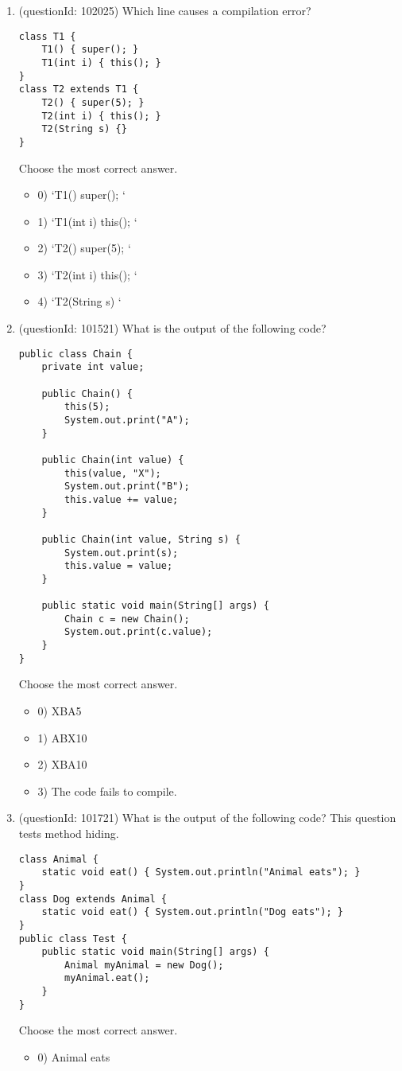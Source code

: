 \documentclass[12pt]{article}
\begin{document}
\begin{enumerate}[label=(\arabic*)]
\begin{itemize}
\end{itemize}
\item (questionId: 102025) Which line causes a compilation error?
\begin{verbatim}
class T1 {
    T1() { super(); }
    T1(int i) { this(); }
}
class T2 extends T1 {
    T2() { super(5); }
    T2(int i) { this(); }
    T2(String s) {}
}
\end{verbatim}
Choose the most correct answer. 
\begin{itemize}
\item 0) `T1() { super(); }`

\item 1) `T1(int i) { this(); }`

\item 2) `T2() { super(5); }`

\item 3) `T2(int i) { this(); }`

\item 4) `T2(String s) {}`

\end{itemize}
\item (questionId: 101521) What is the output of the following code?\n\begin{verbatim}
public class Chain {
    private int value;

    public Chain() {
        this(5);
        System.out.print("A");
    }

    public Chain(int value) {
        this(value, "X");
        System.out.print("B");
        this.value += value;
    }

    public Chain(int value, String s) {
        System.out.print(s);
        this.value = value;
    }

    public static void main(String[] args) {
        Chain c = new Chain();
        System.out.print(c.value);
    }
}
\end{verbatim}
Choose the most correct answer. 
\begin{itemize}
\item 0) XBA5

\item 1) ABX10

\item 2) XBA10

\item 3) The code fails to compile.

\end{itemize}
\item (questionId: 101721) What is the output of the following code? This question tests method hiding.\n\begin{verbatim}
class Animal {
    static void eat() { System.out.println("Animal eats"); }
}
class Dog extends Animal {
    static void eat() { System.out.println("Dog eats"); }
}
public class Test {
    public static void main(String[] args) {
        Animal myAnimal = new Dog();
        myAnimal.eat();
    }
}
\end{verbatim}
Choose the most correct answer. 
\begin{itemize}
\item 0) Animal eats


\end{itemize}
\end{enumerate}
\end{document}
